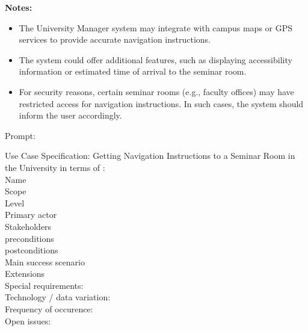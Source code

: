 \documentclass[conference,onecolumn]{IEEEtran}
\begin{document}
\begin{framed}
	\textbf{Notes:}
	
	\begin{itemize}
		\item The University Manager system may integrate with campus maps or GPS services to provide accurate navigation instructions.
		\item The system could offer additional features, such as displaying accessibility information or estimated time of arrival to the seminar room.
		\item For security reasons, certain seminar rooms (e.g., faculty offices) may have restricted access for navigation instructions. In such cases, the system should inform the user accordingly.
	\end{itemize}
\end{framed}

Prompt:
\begin{framed}
	\small
	Use Case Specification: Getting Navigation Instructions to a Seminar Room in the University in terms of :\\
	Name\\
	Scope\\
	Level\\
	Primary actor \\
	Stakeholders\\
	preconditions\\
	postconditions\\
	Main success scenario\\
	Extensions\\
	Special requirements:\\
	Technology / data variation: \\
	Frequency of occurence: \\
	Open issues:
\end{framed}
\end{document}
